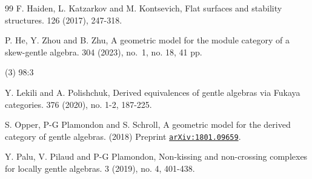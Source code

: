 \documentclass[11pt]{amsart}
\numberwithin{equation}{section}
\theoremstyle{definition}
\begin{document}
\begin{thebibliography}{99}
F. Haiden, L. Katzarkov and M. Kontsevich,
\newblock Flat surfaces and stability structures.
126 (2017), 247-318.



P. He, Y. Zhou and B. Zhu,
\newblock A geometric model for the module category of a skew-gentle algebra.
304 (2023), no.~1, no. 18, 41 pp.



   (3) 98:3  



Y. Lekili and A. Polishchuk,
\newblock Derived equivalences of gentle algebras via Fukaya categories.
 376 (2020), no. 1-2, 187-225.

S. Opper, P-G Plamondon and S. Schroll, 
\newblock A geometric model for the derived category of gentle algebras.
\newblock (2018) Preprint
\href{https://arxiv.org/abs/1801.09659}{\texttt{arXiv:1801.09659}}.


Y. Palu, V. Pilaud and P-G Plamondon,
\newblock Non-kissing and non-crossing complexes for locally gentle algebras.
 3 (2019), no. 4, 401-438.




\end{thebibliography}
\end{document}
